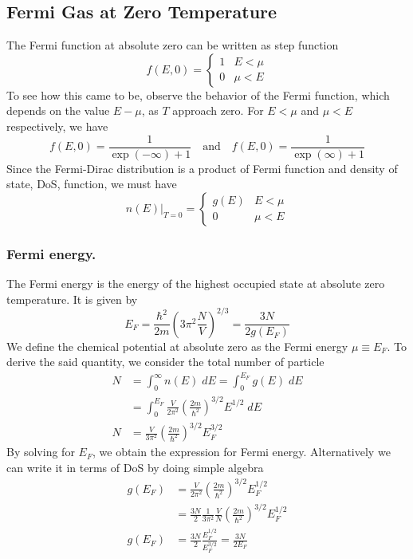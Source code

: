 \documentclass[../../../Main.tex]{subfiles}
\begin{document}
\subsection*{Fermi Gas at Zero Temperature}
The Fermi function at absolute zero can be written as step function
\begin{equation*}
    f(E,0)=\begin{cases}
        1&E<\mu\\
        0&\mu<E
    \end{cases}
\end{equation*}
To see how this came to be, observe the behavior of the Fermi function, which depends on the value $E-\mu$, as $T$ approach zero. For $E<\mu$ and $\mu<E$ respectively, we have
\begin{equation*}
    f(E,0)=\frac{1}{\exp (-\infty)+1}\quad\text{and}\quad f(E,0)=\frac{1}{\exp(\infty)+1}
\end{equation*}
Since the Fermi-Dirac distribution is a product of Fermi function and density of state, DoS, function, we must have 
\begin{equation*}
    n(E)\big|_{T=0}=\begin{cases}
        g(E)&E<\mu\\
        0&\mu<E
    \end{cases}
\end{equation*}

\subsubsection*{Fermi energy.} The Fermi energy is the energy of the highest occupied state at absolute zero temperature.  It is given by
\begin{equation*}
    E_F=\frac{\hbar^2}{2m}\left(3\pi^2\frac{N}{V}\right)^{2/3}=\frac{3N}{2g(E_F)}
\end{equation*}
We define the chemical potential at absolute zero as the Fermi energy  $\mu\equiv E_F$. To derive the said quantity, we consider the total number of particle
\begin{align*}
    N&=\int_{0}^{\infty}n(E)\;dE=\int_{0}^{E_F}g(E)\;dE\\
    &=\int_{0}^{E_F} \frac{V}{2\pi^2}\left(\frac{2m}{\hbar^2}\right)^{3/2}E^{1/2}\;dE\\
    N&=\frac{V}{3\pi^2}\left(\frac{2m}{\hbar^2}\right)^{3/2}E_F^{3/2}
\end{align*}
By solving for $E_F$, we obtain the expression for Fermi energy. Alternatively we can write it in terms of DoS by doing simple algebra
\begin{align*}
    g(E_F)&=\frac{V}{2\pi^2}\left(\frac{2m}{\hbar^2}\right)^{3/2}E_F^{1/2}\\
    &=\frac{3N}{2}\frac{1}{3\pi^2}\frac{V}{N}\left(\frac{2m}{\hbar^2}\right)^{3/2}E_F^{1/2}\\
    g(E_F)&=\frac{3N}{2}\frac{E_F^{1/2}}{E_F^{3/2}}=\frac{3N}{2E_F}
\end{align*}
\end{document}
